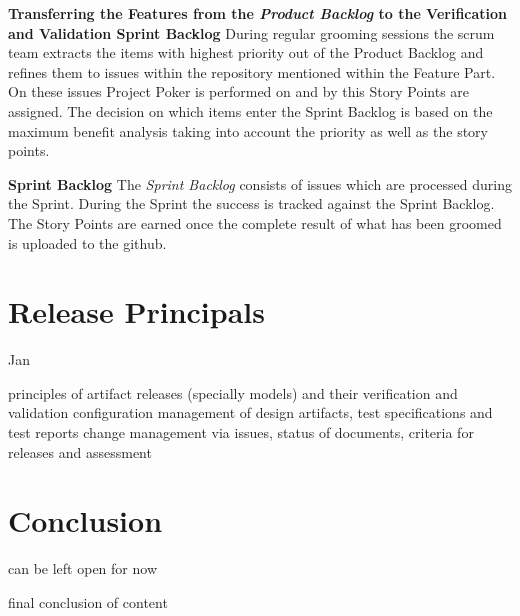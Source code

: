 \textbf{Transferring the Features from the \textit{Product Backlog} to the Verification and Validation Sprint Backlog}
During regular grooming sessions the scrum team extracts the items with highest priority out of the Product Backlog and refines them to issues within the repository mentioned within the Feature Part.
On these issues Project Poker is performed on and by this Story Points are assigned. The decision on which items enter the Sprint Backlog is based on the maximum benefit analysis taking into account the priority as well as the story points.

\textbf{Sprint Backlog}
The \textit{Sprint Backlog} consists of issues which are processed during the Sprint.
During the Sprint the success is tracked against the Sprint Backlog.
The Story Points are earned once the complete result of what has been groomed is uploaded to the github.

\chapter{Release Principals}
\label{sec:Releases}

Jan

principles of artifact releases (specially models) and their verification and validation
configuration management of design artifacts, test specifications and test reports
change management via issues, status of documents, criteria for releases and assessment


\chapter{Conclusion}
\label{sec:conclusion}

can be left open for now

final conclusion of content 


%






